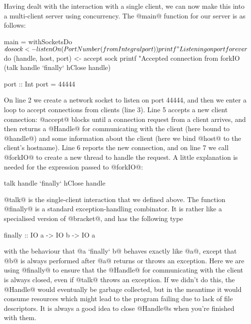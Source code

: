 Having dealt with the interaction with a single client, we can now
make this into a multi-client server using concurrency.  The @main@
function for our server is as follows:

\begin{numhaskell}
main = withSocketsDo $ do
  sock <- listenOn (PortNumber (fromIntegral port))
  printf "Listening on port %
  forever $ do
     (handle, host, port) <- accept sock
     printf "Accepted connection from %
     forkIO (talk handle `finally` hClose handle)

port :: Int
port = 44444
\end{numhaskell}

\noindent On line 2 we create a network socket to listen on port
44444, and then we enter a loop to accept connections from clients
(line 3).  Line 5 accepts a new client connection: @accept@ blocks
until a connection request from a client arrives, and then returns a
@Handle@ for communicating with the client (here bound to @handle@) and
some information about the client (here we bind @host@ to the client's
hostname).  Line 6 reports the new connection, and on line 7 we call
@forkIO@ to create a new thread to handle the request.  A little
explanation is needed for the expression passed to @forkIO@:

\begin{haskell}
   talk handle `finally` hClose handle
\end{haskell}

\noindent @talk@ is the single-client interaction that we defined
above.  The function @finally@ is a standard exception-handling
combinator.  It is rather like a specialised version
of @bracket@, and has the following type

\begin{haskell}
finally :: IO a -> IO b -> IO a
\end{haskell}

\noindent with the behaviour that @a `finally` b@ behaves exactly like
@a@, except that @b@ is always performed after @a@ returns or throws
an exception.  Here we are using @finally@ to ensure that the @Handle@
for communicating with the client is always closed, even if @talk@
throws an exception.  If we didn't do this, the @Handle@ would
eventually be garbage collected, but in the meantime it would consume
resources which might lead to the program failing due to lack of file
descriptors.  It is always a good idea to close @Handle@s when you're
finished with them.


